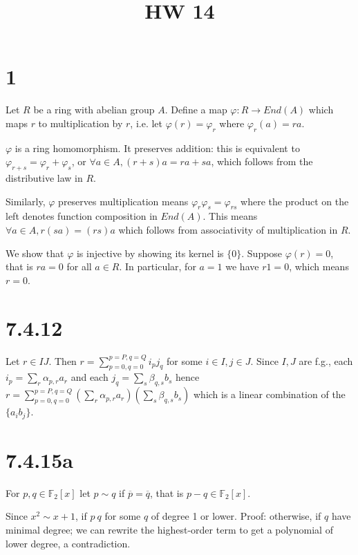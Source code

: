 \documentclass{article}
\title{HW 14}
\date{}
\def\vphi{\varphi}
\begin{document}
\maketitle

\section*{1}

Let $R$ be a ring with abelian group $A$. Define a map $\vphi : R \to End(A)$ which maps $r$ to multiplication by $r$, i.e. let $\vphi(r) = \vphi_r$ where $\vphi_r(a) = r a$.

$\vphi$ is a ring homomorphism. It preserves addition: this is equivalent to $\vphi_{r + s} = \vphi_{r} + \vphi_{s}$, or $\forall a \in A, (r+s)a = ra + sa$, which follows from the distributive law in $R$.

Similarly, $\vphi$ preserves multiplication means $\vphi_r \vphi_s = \vphi_{rs}$ where the product on the left denotes function composition in $End(A)$. This means $\forall a \in A, r(sa) = (rs)a$ which follows from associativity of multiplication in $R$.

We show that $\vphi$ is injective by showing its kernel is $\{0\}$. Suppose $\vphi(r) = 0$, that is $r a = 0$ for all $a \in R$. In particular, for $a=1$ we have $r1 = 0$, which means $r=0$.

\section*{7.4.12}

Let $r \in IJ$. Then $r = \sum_{p=0, q=0}^{p=P,q=Q} i_p j_q$ for some $i \in I, j \in J$. Since $I, J$ are f.g., each $i_p = \sum_{r} \alpha_{p,r} a_r$ and each $j_q = \sum_{s} \beta_{q,s} b_s$ hence $r = \sum_{p=0, q=0}^{p=P,q=Q} (\sum_{r} \alpha_{p,r} a_r) (\sum_{s} \beta_{q,s} b_s)$ which is a linear combination of the $\{a_i b_j \}$.

\section*{7.4.15a}

For $p, q \in \mathbb{F}_2[x]$ let $p \sim q$ if $\overline{p} = \overline{q}$, that is $p-q \in \mathbb{F}_2[x]$.

Since $x^2 \sim x+1$, if $p ~ q$ for some $q$ of degree 1 or lower. Proof: otherwise, if $q$ have minimal degree; we can rewrite the highest-order term to get a polynomial of lower degree, a contradiction.
\end{document}
